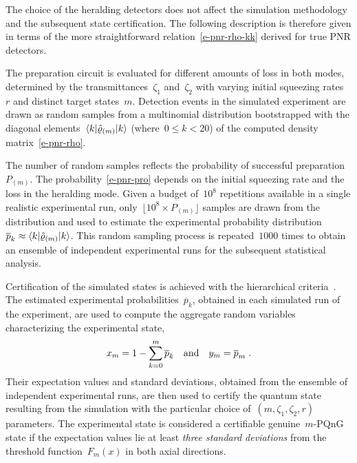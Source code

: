 \documentclass{article}
\begin{document}
The choice of the heralding detectors does not affect the simulation methodology and the subsequent state certification. The following description is therefore given in terms of the more straightforward relation~\eqref{e-pnr-rho-kk} derived for true PNR detectors.

The preparation circuit is evaluated for different amounts of loss in both modes, determined by the transmittances~$\zeta_{1}$ and~$\zeta_{2}$ with varying initial squeezing rates~$r$ and distinct target states~${m}$. Detection events in the simulated experiment are drawn as random samples from a multinomial distribution bootstrapped with the diagonal elements~$\braket{k|\hat{\varrho}_{(m)}|k}$ (where~${0 \leq k < 20}$) of the computed density matrix~\eqref{e-pnr-rho}. 

The number of random samples reflects the probability of successful preparation~$P_{(m)}$. The probability~\eqref{e-pnr-pro} depends on the initial squeezing rate and the loss in the heralding mode. Given a budget of~$10^{8}$ repetitions available in a single realistic experimental run, only~${\lfloor 10^{8} \times P_{(m)} \rfloor}$ samples are drawn from the distribution and used to estimate the experimental probability distribution~${\overline{p}_{k} \approx \braket{k|\hat{\varrho}_{(m)}|k}}$. This random sampling process is repeated~$1000$ times to obtain an ensemble of independent experimental runs for the subsequent statistical analysis.

Certification of the simulated states is achieved with the hierarchical criteria~\cite{lachman2019}. The estimated experimental probabilities~$\overline{p}_{k}$, obtained in each simulated run of the experiment, are used to compute the aggregate random variables characterizing the experimental state,
%
\begin{equation}
  x_{m} = 1 - \sum_{k = 0}^{m} \overline{p}_{k} 
  \quad\text{and}\quad
  y_{m} = \overline{p}_{m} 
  \;\text{.}
\end{equation}
%
Their expectation values and standard deviations, obtained from the ensemble of independent experimental runs, are then used to certify the quantum state resulting from the simulation with the particular choice of~${(m, \zeta_{1}, \zeta_{2}, r)}$ parameters. The experimental state is considered a certifiable genuine~$m$-PQnG state if the expectation values lie at least \emph{three standard deviations} from the threshold function~$F_{m} (x)$ in both axial directions.
\end{document}
